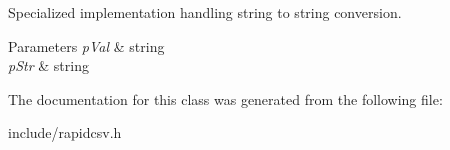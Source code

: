 Specialized implementation handling string to string conversion. 


\begin{DoxyParams}{Parameters}
{\em p\+Val} & string \\
\hline
{\em p\+Str} & string \\
\hline
\end{DoxyParams}


The documentation for this class was generated from the following file\+:\begin{DoxyCompactItemize}
\item 
include/rapidcsv.\+h\end{DoxyCompactItemize}

